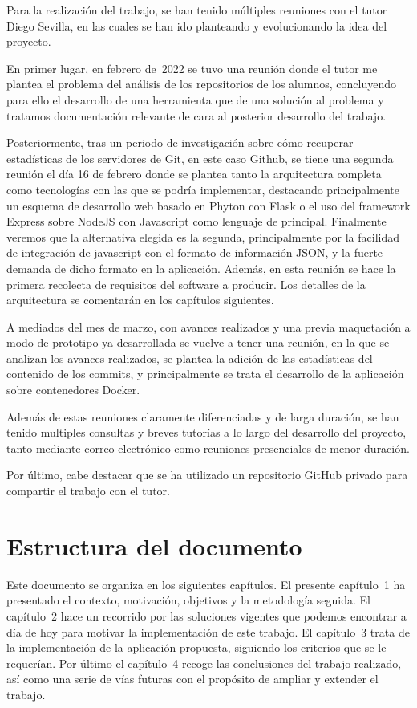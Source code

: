 Para la realización del trabajo, se han tenido múltiples reuniones con el
tutor Diego Sevilla, en las cuales se han ido planteando y evolucionando la
idea del proyecto.

En primer lugar, en febrero de~2022 se tuvo una reunión donde el
tutor me plantea el problema del análisis de los repositorios de los
alumnos, concluyendo para ello el desarrollo de una herramienta que de una
solución al problema y tratamos documentación relevante de cara al
posterior desarrollo del trabajo.

Posteriormente, tras un periodo de investigación sobre cómo recuperar
estadísticas de los servidores de Git, en este caso Github, se tiene una
segunda reunión el día 16 de febrero donde se plantea tanto la
arquitectura completa como tecnologías con las que se podría implementar,
destacando principalmente un esquema de desarrollo web basado en Phyton con
Flask o el uso del framework Express sobre NodeJS con Javascript como
lenguaje de principal. Finalmente veremos que la alternativa elegida es la
segunda, principalmente por la facilidad de integración de javascript con
el formato de información JSON, y la fuerte demanda de dicho formato en la
aplicación. Además, en esta reunión se hace la primera recolecta de
requisitos del software a producir. Los detalles de la arquitectura se
comentarán en los capítulos siguientes.

A mediados del mes de marzo, con avances realizados y una previa
maquetación a modo de prototipo ya desarrollada se vuelve a tener una
reunión, en la que se analizan los avances realizados, se plantea la
adición de las estadísticas del contenido de los commits, y principalmente
se trata el desarrollo de la aplicación sobre contenedores Docker.

Además de estas reuniones claramente diferenciadas y de larga duración, se
han tenido multiples consultas y breves tutorías a lo largo del desarrollo
del proyecto, tanto mediante correo electrónico como reuniones presenciales
de menor duración.

Por último, cabe destacar que se ha utilizado un repositorio GitHub privado
para compartir el trabajo con el tutor.

\section{Estructura del documento}

Este documento se organiza en los siguientes capítulos. El presente
capítulo~1 ha presentado el contexto, motivación, objetivos y la
metodología seguida. El capítulo~2 hace un recorrido por las soluciones
vigentes que podemos encontrar a día de hoy para motivar la implementación
de este trabajo. El capítulo~3 trata de la implementación de la aplicación
propuesta, siguiendo los criterios que se le requerían. Por último el
capítulo~4 recoge las conclusiones del trabajo realizado, así como una
serie de vías futuras con el propósito de ampliar y extender el trabajo.

